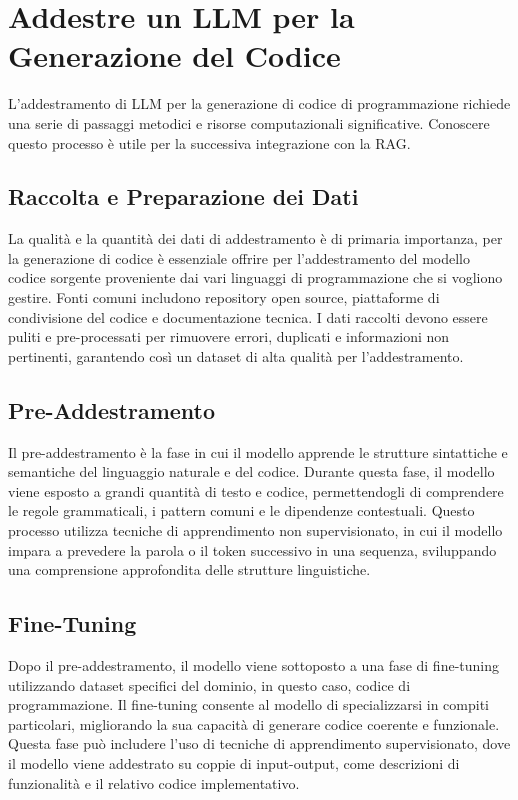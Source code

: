 \documentclass[12pt,a4paper,openright,twoside]{book}
\begin{document}
\chapter{Addestre un LLM per la Generazione del Codice}

L'addestramento di LLM per la generazione di codice di programmazione richiede una serie di passaggi metodici e risorse computazionali significative.
Conoscere questo processo è utile per la successiva integrazione con la RAG.

\section{Raccolta e Preparazione dei Dati}
La qualità e la quantità dei dati di addestramento è di primaria importanza, per la generazione di codice è essenziale offrire per l'addestramento del modello
codice sorgente proveniente dai vari linguaggi di programmazione che si vogliono gestire. Fonti comuni includono repository open source, piattaforme di condivisione del codice e documentazione tecnica. I dati raccolti devono essere puliti e pre-processati per rimuovere errori, duplicati e informazioni non pertinenti, garantendo così un dataset di alta qualità per l'addestramento.

\section{Pre-Addestramento}
Il pre-addestramento è la fase in cui il modello apprende le strutture sintattiche e semantiche del linguaggio naturale e del codice. Durante questa fase, il modello viene esposto a grandi quantità di testo e codice, permettendogli di comprendere le regole grammaticali, i pattern comuni e le dipendenze contestuali. Questo processo utilizza tecniche di apprendimento non supervisionato, in cui il modello impara a prevedere la parola o il token successivo in una sequenza, sviluppando una comprensione approfondita delle strutture linguistiche.

\section{Fine-Tuning}
Dopo il pre-addestramento, il modello viene sottoposto a una fase di fine-tuning utilizzando dataset specifici del dominio, in questo caso, codice di programmazione. Il fine-tuning consente al modello di specializzarsi in compiti particolari, migliorando la sua capacità di generare codice coerente e funzionale. Questa fase può includere l'uso di tecniche di apprendimento supervisionato, dove il modello viene addestrato su coppie di input-output, come descrizioni di funzionalità e il relativo codice implementativo.
\end{document}
